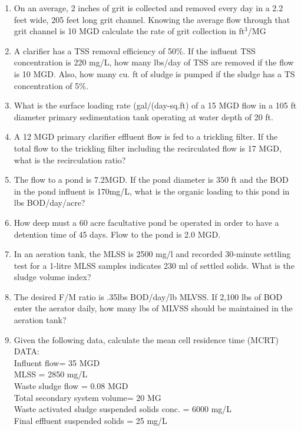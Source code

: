\begin{tcolorbox}[breakable, enhanced,
colframe=blue!25,
colback=blue!10,
coltitle=blue!20!black,  
title= Chapter Assessment]
\begin{enumerate}
\item On an average, 2 inches of grit is collected and removed every day in a 2.2 feet wide, 205 feet long grit channel.  Knowing the average flow through that grit channel is 10 MGD calculate the rate of grit collection in ft$^3$/MG\\


\item A clarifier has a TSS removal efficiency of 50\%.  If the influent TSS concentration is 220 mg/L, how many lbs/day of TSS are removed if the flow is 10 MGD.  Also, how many cu. ft of sludge is pumped if the sludge has a TS concentration of 5\%.\\


\item What is the surface loading rate (gal/(day-sq.ft) of a 15 MGD flow in a 105 ft diameter primary sedimentation tank operating at water depth of 20 ft.\\

\item  A 12 MGD primary clarifier effluent flow is fed to a trickling filter. If the total flow to the trickling filter including the recirculated flow is 17 MGD, what is the recirculation ratio? \\

\item The flow to a pond is 7.2MGD. If the pond diameter is 350 ft and the BOD in the pond influent is 170mg/L, what is the organic loading to this pond in lbs BOD/day/acre?

\item How deep must a 60 acre facultative pond be operated in order to have a detention time of 45 days. Flow to the pond is 2.0 MGD. 

\item In an aeration tank, the MLSS is 2500 mg/l and recorded 30-minute settling test for a 1-litre MLSS samples indicates 230 ml of settled solids. What is the sludge volume index?

\item The desired F/M ratio is .35lbs BOD/day/lb MLVSS.  If 2,100 lbs of BOD enter the aerator daily, how many lbs of MLVSS should be maintained in the aeration tank? \\ 

\item Given the following data, calculate the mean cell residence time (MCRT)\\
DATA: \\
Influent flow= 35 MGD\\
MLSS = 2850 mg/L\\
Waste sludge flow = 0.08 MGD\\
Total secondary system volume= 20 MG\\
Waste activated sludge suspended solids conc. = 6000 mg/L\\
Final effluent suspended solids = 25 mg/L \\


\end{enumerate}
\end{tcolorbox}
